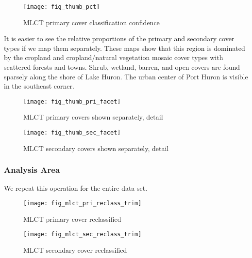 \begin{figure} 
\begin{center}
  

\texttt{[image: fig\_thumb\_pct]}
\end{center} 
\caption{MLCT primary cover classification confidence} 
\label{fig:thumb_pct} 
\end{figure} 

It is easier to see the relative proportions of the primary and
secondary cover types if we map them separately.  These maps show that
this region is dominated by the cropland and cropland/natural
vegetation mosaic cover types with scattered forests and towns.
Shrub, wetland, barren, and open covers are found sparsely along the
shore of Lake Huron.  The urban center of Port Huron is visible in the
southeast corner.

\begin{figure} 
\begin{center}
  

\texttt{[image: fig\_thumb\_pri\_facet]}
\end{center} 
\caption{MLCT primary covers shown separately, detail} 
\label{fig:thumb_pri_facet} 
\end{figure} 


\begin{figure} 
\begin{center}
  

\texttt{[image: fig\_thumb\_sec\_facet]}
\end{center} 
\caption{MLCT secondary covers shown separately, detail} 
\label{fig:thumb_pri_reclass} 
\end{figure} 

\subsubsection{Analysis Area}
\label{sec:reclass-analysis-area}

We repeat this operation for the entire data set.



\begin{figure} 
\begin{center}


\texttt{[image: fig\_mlct\_pri\_reclass\_trim]}
\end{center} 
\caption{MLCT primary cover reclassified} 
\label{fig:mlct_pri_reclass} 
\end{figure} 


\begin{figure} 
\begin{center}
  

\texttt{[image: fig\_mlct\_sec\_reclass\_trim]}
\end{center} 
\caption{MLCT secondary cover reclassified} 
\label{fig:mlct_sec_reclass} 
\end{figure} 



